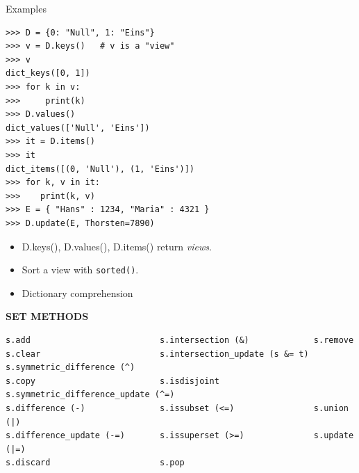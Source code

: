 \documentclass[9pt,a4wide]{extarticle}
\begin{document}
\bigskip

Examples

\begin{verbatim}
>>> D = {0: "Null", 1: "Eins"}
>>> v = D.keys()   # v is a "view"
>>> v
dict_keys([0, 1])
>>> for k in v:
>>>     print(k)
>>> D.values()
dict_values(['Null', 'Eins'])
>>> it = D.items()
>>> it
dict_items([(0, 'Null'), (1, 'Eins')])
>>> for k, v in it:
>>>    print(k, v)
>>> E = { "Hans" : 1234, "Maria" : 4321 }
>>> D.update(E, Thorsten=7890)
\end{verbatim}

\begin{itemize}
\item D.keys(), D.values(), D.items() return {\em views}. 
\item Sort a view with {\tt sorted()}.
\item Dictionary comprehension
\end{itemize}




\bigskip
{\LARGE\bf SET METHODS}
{}

\begin{verbatim}
s.add                          s.intersection (&)             s.remove
s.clear                        s.intersection_update (s &= t) s.symmetric_difference (^)
s.copy                         s.isdisjoint                   s.symmetric_difference_update (^=)
s.difference (-)               s.issubset (<=)                s.union (|)
s.difference_update (-=)       s.issuperset (>=)              s.update (|=)
s.discard                      s.pop                          
\end{verbatim}


\bigskip
\end{document}
